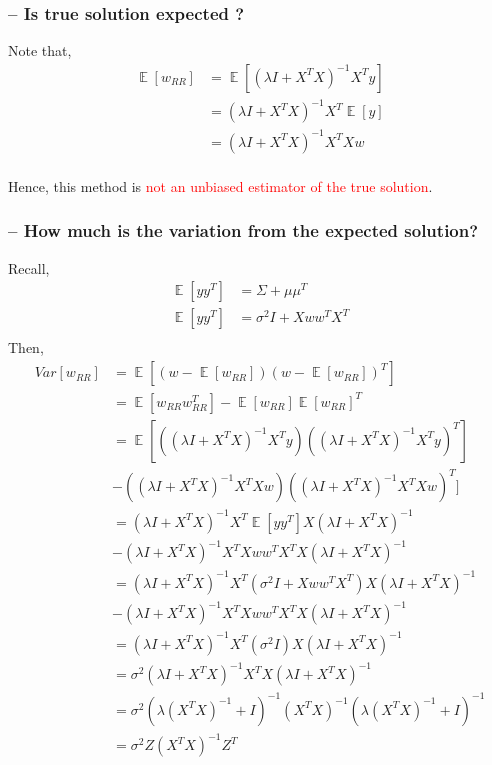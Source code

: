 \documentclass{article}
\DeclareMathOperator*{\E}{\mathop{\mathbb{E}}}
\newcommand{\red}[1]{\textcolor{red}{#1}}
\begin{document}
\subsubsection{-- Is true solution expected ?}

Note that,
\begin{align*}
    \E[w_{RR}] &= \E[(\lambda I + X^TX)^{-1}X^Ty]\\
    &= (\lambda I + X^TX)^{-1}X^T \E[y]\\
    &= (\lambda I + X^TX)^{-1} X^TX w\\
\end{align*}

Hence, this method is \red{not an unbiased estimator of the true solution}.

\subsubsection{-- How much is the variation from the expected solution?}
Recall,
\begin{align*}
    \E[yy^T] &= \Sigma + \mu\mu^T\\
    \E[yy^T] &= \sigma^2I + Xww^TX^T\\
\end{align*}
Then,
\begin{align*}
    Var[w_{RR}] &= \E[(w-\E[w_{RR}])(w-\E[w_{RR}])^T]\\
    & = \E[w_{RR}w_{RR}^T]-\E[w_{RR}]\E[w_{RR}]^T\\
    & = \E[\left( (\lambda I + X^TX)^{-1} X^Ty \right) \left( (\lambda I + X^TX)^{-1} X^Ty \right)^T] \\
    & -\left( (\lambda I + X^TX)^{-1} X^TX w \right) \left( (\lambda I + X^TX)^{-1} X^TX w \right)^T]\\
    & = (\lambda I + X^TX)^{-1} X^T \E[yy^T] X (\lambda I + X^TX)^{-1} \\
    & - (\lambda I + X^TX)^{-1} X^TX ww^T X^T X (\lambda I + X^TX)^{-1}\\
    & = (\lambda I + X^TX)^{-1} X^T (\sigma^2I + Xww^TX^T) X (\lambda I + X^TX)^{-1} \\
    & - (\lambda I + X^TX)^{-1} X^TX ww^T X^T X (\lambda I + X^TX)^{-1}\\
    & = (\lambda I + X^TX)^{-1} X^T (\sigma^2I) X (\lambda I + X^TX)^{-1}\\
    & = \sigma^2 (\lambda I + X^TX)^{-1} X^T X (\lambda I + X^TX)^{-1}\\
    & = \sigma^2 (\lambda (X^TX)^{-1} + I)^{-1} (X^T X)^{-1} (\lambda (X^TX)^{-1} + I)^{-1}\\
    & = \sigma^2 Z (X^T X)^{-1} Z^T\\
\end{align*}
\end{document}
